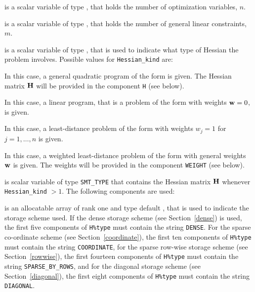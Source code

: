 \documentclass{galahad}
\begin{document}
\begin{description}

 is a scalar variable of type \integer, 
 that holds the number of optimization variables, $n$.  
              
 is a scalar variable of type \integer, 
 that holds the number of general linear constraints, $m$.
              
 is a scalar variable of type \integer, 
that is used to indicate what type of Hessian the problem involves.
Possible values for {\tt Hessian\_kind} are:

\begin{description}
  In this case, a general quadratic program of the form
 is given. The Hessian matrix ${\mathbf{H}}$ will be provided in the 
component {\tt H} (see below).

  In this case, a linear program, that is a problem of the form 
 with weights ${\mathbf{w}} = 0$, is given.

 In this case, a least-distance problem of the form 
with weights $w_{j} = 1$ for $j = 1, \ldots , n$ is given.

 In this case, a weighted least-distance problem of the form 
with general weights ${\mathbf{w}}$ is given. The weights will be
provided in the component {\tt WEIGHT} (see below).
\end{description}

 is scalar variable of type {\tt SMT\_TYPE} 
that contains the Hessian matrix ${\mathbf{H}}$ whenever {\tt Hessian\_kind} $>1$.
The following components are used:

\begin{description}

 is an allocatable array of rank one and type default \character, 
that is used to indicate the storage scheme used. If the dense storage scheme 
(see Section~\ref{dense}) is used, 
the first five components of {\tt H\%type} must contain the
string {\tt DENSE}.
For the sparse co-ordinate scheme (see Section~\ref{coordinate}), 
the first ten components of {\tt H\%type} must contain the
string {\tt COORDINATE},  
for the sparse row-wise storage scheme (see Section~\ref{rowwise}),
the first fourteen components of {\tt H\%type} must contain the
string {\tt SPARSE\_BY\_ROWS},
and for the diagonal storage scheme (see Section~\ref{diagonal}),
the first eight components of {\tt H\%type} must contain the
string {\tt DIAGONAL}.


\end{description}
\end{description}
\end{document}
